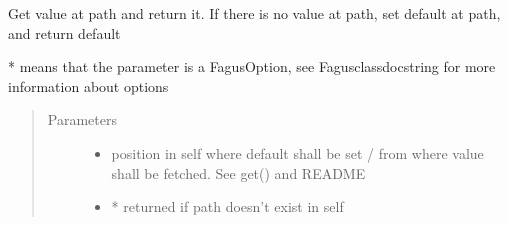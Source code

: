 \documentclass[a4paper,10pt,english]{sphinxmanual}
\begin{document}
\begin{fulllineitems}
\begin{fulllineitems}
\label{\detokenize{fagus:fagus.Fagus.setdefault}}
\pysigstartsignatures
{}
\pysigstopsignatures
\sphinxAtStartPar
Get value at path and return it. If there is no value at path, set default at path, and return default

\sphinxAtStartPar
* means that the parameter is a FagusOption, see Fagus\sphinxhyphen{}class\sphinxhyphen{}docstring for more information about options
\begin{quote}\begin{description}
\item[{Parameters}] \leavevmode\begin{itemize}
\item {}
\sphinxAtStartPar
{} \textendash{} position in self where default shall be set / from where value shall be fetched. See get() and README

\item {}
\sphinxAtStartPar
{} \textendash{} * returned if path doesn’t exist in self


\end{itemize}
\end{description}
\end{quote}
\end{fulllineitems}
\end{fulllineitems}
\end{document}

